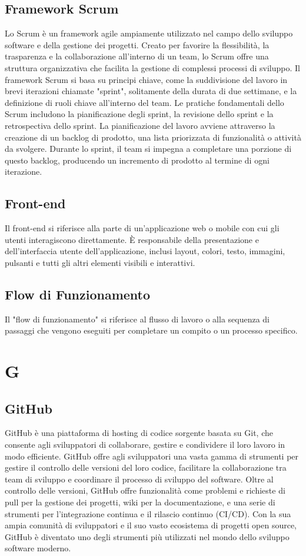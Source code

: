\documentclass{article}
\begin{document}
\subsection{Framework Scrum}
Lo Scrum è un framework agile ampiamente utilizzato nel campo dello sviluppo software e della gestione dei progetti. Creato per favorire la flessibilità, la trasparenza e la collaborazione all'interno di un team, lo Scrum offre una struttura organizzativa che facilita la gestione di complessi processi di sviluppo. Il framework Scrum si basa su principi chiave, come la suddivisione del lavoro in brevi iterazioni chiamate "sprint", solitamente della durata di due settimane, e la definizione di ruoli chiave all'interno del team. Le pratiche fondamentali dello Scrum includono la pianificazione degli sprint, la revisione dello sprint e la retrospectiva dello sprint. La pianificazione del lavoro avviene attraverso la creazione di un backlog di prodotto, una lista priorizzata di funzionalità o attività da svolgere. Durante lo sprint, il team si impegna a completare una porzione di questo backlog, producendo un incremento di prodotto al termine di ogni iterazione.

\subsection{Front-end}
Il front-end si riferisce alla parte di un'applicazione web o mobile con cui gli utenti interagiscono direttamente. È responsabile della presentazione e dell'interfaccia utente dell'applicazione, inclusi layout, colori, testo, immagini, pulsanti e tutti gli altri elementi visibili e interattivi.

\subsection{Flow di Funzionamento}
 Il "flow di funzionamento" si riferisce al flusso di lavoro o alla sequenza di passaggi che vengono eseguiti per completare un compito o un processo specifico.

\section{G}
\subsection{GitHub}
GitHub è una piattaforma di hosting di codice sorgente basata su Git, che consente agli sviluppatori di collaborare, gestire e condividere il loro lavoro in modo efficiente. GitHub offre agli sviluppatori una vasta gamma di strumenti per gestire il controllo delle versioni del loro codice, facilitare la collaborazione tra team di sviluppo e coordinare il processo di sviluppo del software. Oltre al controllo delle versioni, GitHub offre funzionalità come problemi e richieste di pull per la gestione dei progetti, wiki per la documentazione, e una serie di strumenti per l'integrazione continua e il rilascio continuo (CI/CD). Con la sua ampia comunità di sviluppatori e il suo vasto ecosistema di progetti open source, GitHub è diventato uno degli strumenti più utilizzati nel mondo dello sviluppo software moderno.
\end{document}
